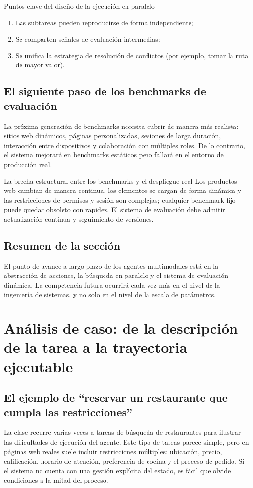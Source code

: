 \documentclass[a4paper]{article}
\begin{document}
\begin{knowledgebox}{Puntos clave del diseño de la ejecución en paralelo}
\begin{enumerate}
    \item Las subtareas pueden reproducirse de forma independiente;
    \item Se comparten señales de evaluación intermedias;
    \item Se unifica la estrategia de resolución de conflictos (por ejemplo, tomar la ruta de mayor valor).
\end{enumerate}
\end{knowledgebox}

\subsection{El siguiente paso de los benchmarks de evaluación}
La próxima generación de benchmarks necesita cubrir de manera más realista: sitios web dinámicos, páginas personalizadas, sesiones de larga duración, interacción entre dispositivos y colaboración con múltiples roles. De lo contrario, el sistema mejorará en benchmarks estáticos pero fallará en el entorno de producción real.

\begin{warningbox}{La brecha estructural entre los benchmarks y el despliegue real}
Los productos web cambian de manera continua, los elementos se cargan de forma dinámica y las restricciones de permisos y sesión son complejas; cualquier benchmark fijo puede quedar obsoleto con rapidez. El sistema de evaluación debe admitir actualización continua y seguimiento de versiones.
\end{warningbox}

\subsection{Resumen de la sección}
El punto de avance a largo plazo de los agentes multimodales está en la abstracción de acciones, la búsqueda en paralelo y el sistema de evaluación dinámica. La competencia futura ocurrirá cada vez más en el nivel de la ingeniería de sistemas, y no solo en el nivel de la escala de parámetros.
\section{Análisis de caso: de la descripción de la tarea a la trayectoria ejecutable}

\subsection{El ejemplo de ``reservar un restaurante que cumpla las restricciones''}
La clase recurre varias veces a tareas de búsqueda de restaurantes para ilustrar las dificultades de ejecución del agente. Este tipo de tareas parece simple, pero en páginas web reales suele incluir restricciones múltiples: ubicación, precio, calificación, horario de atención, preferencia de cocina y el proceso de pedido. Si el sistema no cuenta con una gestión explícita del estado, es fácil que olvide condiciones a la mitad del proceso.
\end{document}
